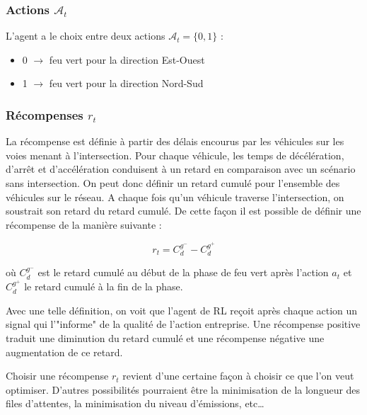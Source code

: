 \documentclass[11pt]{article}
\begin{document}
\subsubsection{Actions \(\mathcal{A}_t\)}
\label{sec:orgf77c04e}

L'agent a le choix entre deux actions \(\mathcal{A}_t = \{0,1\}\) :

\begin{itemize}
\item 0 \(\to\) feu vert pour la direction Est-Ouest
\item 1 \(\to\) feu vert pour la direction Nord-Sud
\end{itemize}

\subsubsection{Récompenses \(r_t\)}
\label{sec:org899da2c}

La récompense est définie à partir des délais encourus par les véhicules sur les voies menant à 
l'intersection. Pour chaque véhicule, les temps de décélération, d'arrêt et d'accélération conduisent
à un retard en comparaison avec un scénario sans intersection. On peut donc définir un retard cumulé
pour l'ensemble des véhicules sur le réseau. A chaque fois qu'un véhicule traverse l'intersection, on 
soustrait son retard du retard cumulé. De cette façon il est possible de définir une récompense de 
la manière suivante : 

\begin{latex}
\begin{equation}
r_t = C_{d}^{g^{-}} - C_{d}^{g^{+}}
\label{eqn:Einstein}
\end{equation}
\end{latex}

où \(C_{d}^{g^{-}}\) est le retard cumulé au début de la phase de feu vert après l'action \(a_t\) et \(C_{d}^{g^{+}}\) le retard cumulé à la fin de la phase.


Avec une telle définition, on voit que l'agent de RL reçoit après chaque action un signal qui l'"informe" de la qualité de l'action entreprise. Une récompense positive traduit une diminution du retard cumulé et une récompense négative une augmentation de ce retard.

Choisir une récompense \(r_t\) revient d'une certaine façon à choisir ce que l'on veut optimiser. D'autres possibilités pourraient être la minimisation de la longueur des files d'attentes, la minimisation du niveau d'émissions, etc\ldots
\end{document}
